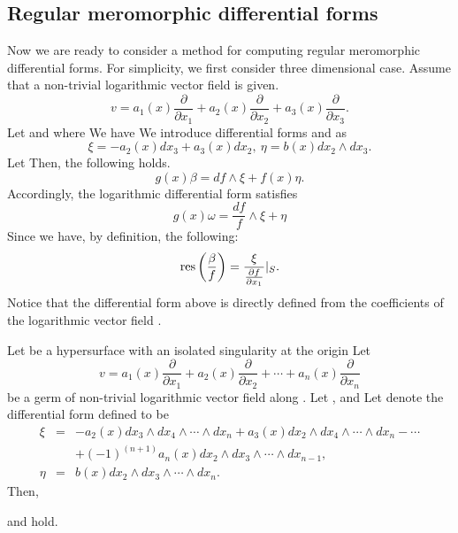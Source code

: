 \documentclass{arxsigma}
\begin{document}
\subsection{Regular meromorphic differential forms}
Now we are ready to consider a method for computing regular meromorphic differential forms. For simplicity, we first consider three dimensional case.
Assume that a non-trivial logarithmic vector field   is given.
\begin{equation*}
v=a_1(x)\frac{\partial}{\partial x_1} + a_2(x)\frac{\partial}{\partial x_2}+a_3(x)\frac{\partial}{\partial x_3}.
\end{equation*}
Let   and   where  
We have  
We introduce differential forms   and   as
\begin{equation*}
\xi=-a_2(x)dx_3+a_3(x)dx_2, \ \eta =b(x)dx_2\wedge dx_3.
\end{equation*}
Let   Then, the following holds.
\begin{equation*}
g(x)\beta= df \wedge \xi + f(x)\eta.
\end{equation*}
Accordingly, the logarithmic differential form   satisfies
\begin{equation*}
g(x)\omega=\frac{df}{f} \wedge \xi + \eta
\end{equation*}
Since   we have, by definition, the following:
\begin{equation*}{\rm res}\left(\frac{\beta}{f}\right) = \frac{\xi}{\frac{\partial f}{\partial x_1}}|_S.
\end{equation*}
Notice that the differential form
  above is directly defined from the coefficients of
the logarithmic vector field  .
\begin{proposition}\label{pro4}
Let   be a hypersurface with an isolated singularity at the origin   Let
\begin{equation*}
v=a_1(x)\frac{\partial}{\partial x_1} + a_2(x)\frac{\partial}{\partial x_2}+ \cdots +a_n(x)\frac{\partial}{\partial x_n}
\end{equation*}
be a germ of
non-trivial logarithmic vector field along  . Let  ,   and   Let   denote the differential form defined to be
\begin{eqnarray*}
\xi &=& -a_2(x)dx_3 \wedge dx_4 \wedge \cdots \wedge dx_n +a_3(x)dx_2 \wedge dx_4 \wedge \cdots \wedge dx_n - \cdots \\ & & +(-1)^{(n+1)}a_n(x)dx_2 \wedge dx_3 \wedge \cdots \wedge dx_{n-1}, \\ \eta &=& b(x) dx_2 \wedge dx_3 \wedge \cdots \wedge dx_n.
\end{eqnarray*}
Then,
 
and   hold.
\end{proposition}
\end{document}
